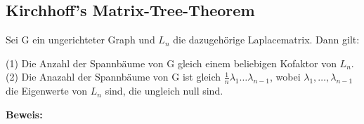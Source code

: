 \subsection{Kirchhoff's Matrix-Tree-Theorem}
\begin{Tms}
Sei G ein ungerichteter Graph und $L_n$  die dazugehörige Laplacematrix. 
Dann gilt:
\par
\begingroup
\leftskip=20pt%
\rightskip=20pt
\noindent %
(1) Die Anzahl der Spannbäume von G gleich einem beliebigen Kofaktor von $L_n$.\\
(2) Die Anazahl der Spannbäume von G ist gleich $\frac{1}{n}\lambda_1\ldots\lambda_{n-1}$, wobei $\lambda_1,\ldots,\lambda_{n-1}$ die Eigenwerte von $L_n$ sind, die ungleich null sind.
\par
\endgroup
\end{Tms}
\textbf{Beweis:}
 
